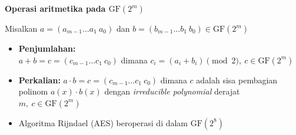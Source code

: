 \documentclass{article}
\begin{document}

\textbf{Operasi aritmetika pada $\text{GF}(2^m)$}

Misalkan $a = (a_{m-1} \dots a_1 \ a_0)$ dan $b = (b_{m-1} \dots b_1 \ b_0) \in \text{GF}(2^m)$

\begin{itemize}
    \item \textbf{Penjumlahan:} \\
    $a + b = c = (c_{m-1} \dots c_1 \ c_0)$ dimana $c_i = (a_i + b_i) \pmod 2, \ c \in \text{GF}(2^m)$
    
    \item \textbf{Perkalian:} $a \cdot b = c = (c_{m-1} \dots c_1 \ c_0)$ dimana $c$ adalah sisa pembagian polinom $a(x) \cdot b(x)$ dengan \textit{irreducible polynomial} derajat $m, \ c \in \text{GF}(2^m)$
    
    \item Algoritma Rijndael (AES) beroperasi di dalam $\text{GF}(2^8)$
\end{itemize}
\end{document}
